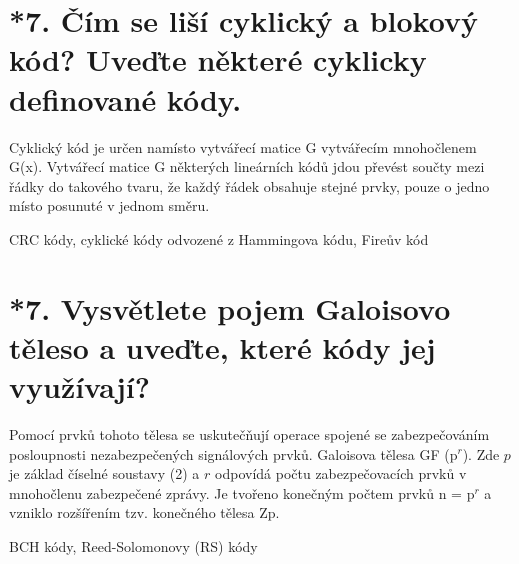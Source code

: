 \section{*7. Čím se liší cyklický a blokový kód? Uveďte některé cyklicky definované kódy.}
Cyklický kód je určen namísto vytvářecí matice G vytvářecím mnohočlenem G(x).
Vytvářecí matice G některých lineárních kódů jdou převést součty mezi řádky do takového tvaru, že každý řádek obsahuje stejné prvky, pouze o jedno místo posunuté v jednom směru.

CRC kódy, cyklické kódy odvozené z Hammingova kódu, Fireův kód 

\section{*7. Vysvětlete pojem Galoisovo těleso a uveďte, které kódy jej využívají?}
Pomocí prvků tohoto tělesa se uskutečňují operace spojené se zabezpečováním posloupnosti nezabezpečených signálových prvků. Galoisova tělesa GF (p$^r$). Zde $p$ je základ číselné soustavy (2) a $r$ odpovídá počtu zabezpečovacích prvků v mnohočlenu zabezpečené zprávy. Je tvořeno konečným počtem prvků n = p$^r$  a vzniklo rozšířením tzv. konečného tělesa Zp.

BCH kódy, Reed-Solomonovy (RS) kódy
